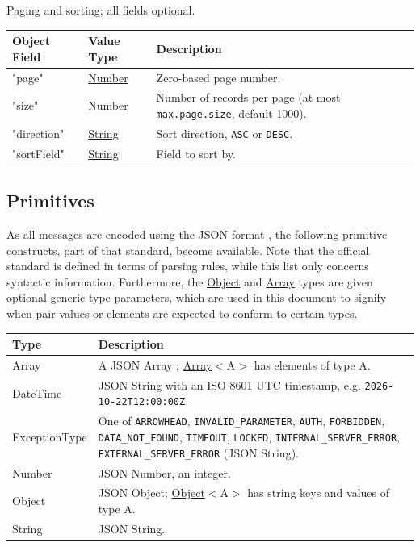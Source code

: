 \documentclass[a4paper]{arrowhead}
\newcommand{\pdef}[1]{{\textcolor{ArrowheadGrey}{#1 \label{sec:model:primitives:#1} \label{sec:model:primitives:#1s}}}}
\newcommand{\pref}[1]{{\textcolor{ArrowheadGrey}{\hyperref[sec:model:primitives:#1]{#1}}}}
\begin{document}

Paging and sorting; all fields optional.


\noindent\begin{tabularx}{\textwidth}{| >{\raggedright\arraybackslash}p{3.9cm} | >{\raggedright\arraybackslash\small}p{5.3cm} | X |} \hline
\rowcolor{gray!33} Object Field & Value Type & Description \\ \hline
"page" & \pref{Number} & Zero-based page number. \\ \hline
"size" & \pref{Number} & Number of records per page (at most \texttt{max.\allowbreak{}page.\allowbreak{}size}, default 1000). \\ \hline
"direction" & \pref{String} & Sort direction, \texttt{ASC} or \texttt{DESC}. \\ \hline
"sort\allowbreak{}Field" & \pref{String} & Field to sort by. \\ \hline
\end{tabularx}



\subsection{Primitives}
\label{sec:model:primitives}

As all messages are encoded using the JSON format \cite{rfc8259}, the following primitive constructs, part of that standard, become available.
Note that the official standard is defined in terms of parsing rules, while this list only concerns syntactic information.
Furthermore, the \pref{Object} and \pref{Array} types are given optional generic type parameters, which are used in this document to signify when pair values or elements are expected to conform to certain types.

\noindent\begin{tabularx}{\textwidth}{| p{4.6cm} | X |} \hline
\rowcolor{gray!33} Type & Description \\ \hline
\pdef{Array} & A JSON Array \cite{rfc8259}; \pref{Array}$<$A$>$ has elements of type A. \\ \hline
\pdef{DateTime} & JSON String with an ISO 8601 UTC timestamp, e.g. \texttt{2026-10-22T12:00:00Z}. \\ \hline
\pdef{ExceptionType} & One of \texttt{ARROWHEAD}, \texttt{INVALID\_\allowbreak{}PARAMETER}, \texttt{AUTH}, \texttt{FORBIDDEN}, \texttt{DATA\_\allowbreak{}NOT\_\allowbreak{}FOUND}, \texttt{TIMEOUT}, \texttt{LOCKED}, \texttt{INTERNAL\_\allowbreak{}SERVER\_\allowbreak{}ERROR}, \texttt{EXTERNAL\_\allowbreak{}SERVER\_\allowbreak{}ERROR} (JSON String). \\ \hline
\pdef{Number} & JSON Number, an integer. \\ \hline
\pdef{Object} & JSON Object; \pref{Object}$<$A$>$ has string keys and values of type A. \\ \hline
\pdef{String} & JSON String. \\ \hline
\end{tabularx}
\end{document}
